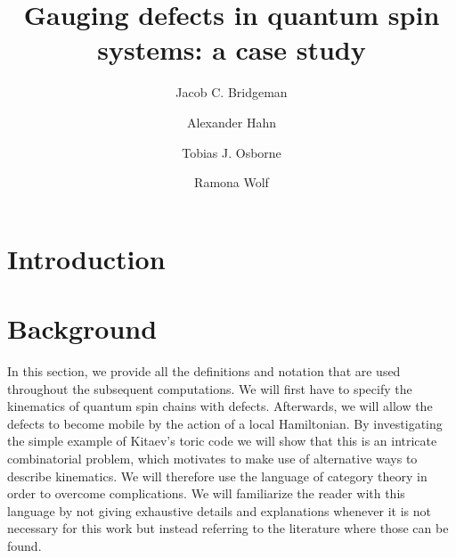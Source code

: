 




\title{Gauging defects in quantum spin systems: a case study}


\author{Jacob C. Bridgeman}
\author{Alexander Hahn}
\author{Tobias J. Osborne}
\author{Ramona Wolf}

                            

\begin{abstract}

\end{abstract}


\maketitle

\section{Introduction}


\section{Background}\label{S:defs}
In this section, we provide all the definitions and notation that are used throughout the subsequent computations. We will first have to specify the kinematics of quantum spin chains with defects. Afterwards, we will allow the defects to become mobile by the action of a local Hamiltonian. By investigating the simple example of Kitaev's toric code \cite{Kit03} we will show that this is an intricate combinatorial problem, which motivates to make use of alternative ways to describe kinematics. We will therefore use the language of category theory in order to overcome complications. We will familiarize the reader with this language by not giving exhaustive details and explanations whenever it is not necessary for this work but instead referring to the literature where those can be found.

